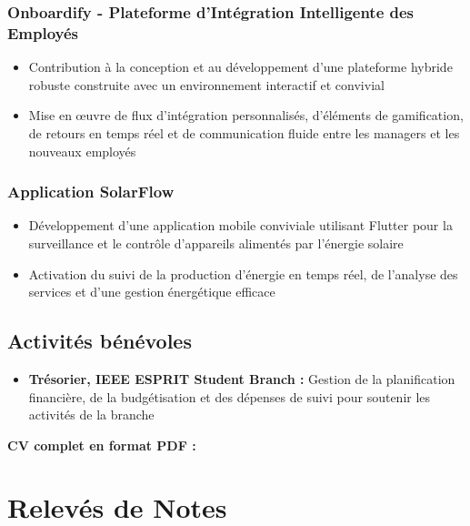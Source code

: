 \documentclass[12pt,a4paper]{article}
\begin{document}
\begin{itemize}
\subsubsection{Onboardify - Plateforme d'Intégration Intelligente des Employés}
\begin{itemize}
    \item Contribution à la conception et au développement d'une plateforme hybride robuste construite avec un environnement interactif et convivial
    \item Mise en œuvre de flux d'intégration personnalisés, d'éléments de gamification, de retours en temps réel et de communication fluide entre les managers et les nouveaux employés
\end{itemize}

\subsubsection{Application SolarFlow}
\begin{itemize}
    \item Développement d'une application mobile conviviale utilisant Flutter pour la surveillance et le contrôle d'appareils alimentés par l'énergie solaire
    \item Activation du suivi de la production d'énergie en temps réel, de l'analyse des services et d'une gestion énergétique efficace
\end{itemize}

\subsection{Activités bénévoles}
\begin{itemize}
    \item \textbf{Trésorier, IEEE ESPRIT Student Branch :} Gestion de la planification financière, de la budgétisation et des dépenses de suivi pour soutenir les activités de la branche
\end{itemize}

\vspace{1cm}

\textbf{CV complet en format PDF :}



\newpage

\section{Relevés de Notes}
\label{sec:releves}


\end{itemize}
\end{document}
